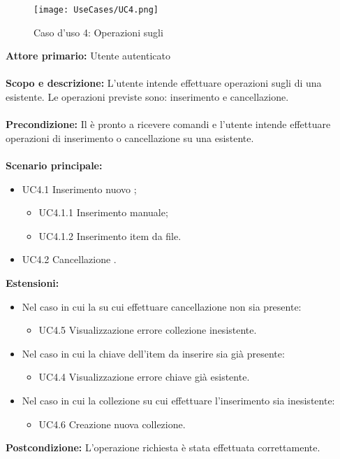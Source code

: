\documentclass{scalatekids-article}
\begin{document}
\begin{figure}[H]
  \begin{center}
    \texttt{[image: UseCases/UC4.png]}
    \caption*{Caso d'uso 4: Operazioni sugli }
  \end{center}
\end{figure}
\textbf{Attore primario:} Utente autenticato\\ \\
\textbf{Scopo e descrizione:} L'utente intende effettuare operazioni sugli  di una  esistente. Le operazioni previste sono:
inserimento e cancellazione.\\ \\
\textbf{Precondizione:} Il  è pronto a ricevere comandi e l'utente intende effettuare operazioni di inserimento o cancellazione su una  esistente.\\ \\
\textbf{Scenario principale:}
\begin{itemize}
\item UC4.1 Inserimento nuovo ;
  \begin{itemize}
  \item UC4.1.1 Inserimento  manuale;
  \item UC4.1.2 Inserimento  item da file.
  \end{itemize}
\item UC4.2 Cancellazione .
\end{itemize}
\textbf{Estensioni:}
\begin{itemize}
\item Nel caso in cui la  su cui effettuare cancellazione non sia presente:
  \begin{itemize}
  \item UC4.5 Visualizzazione errore collezione inesistente.
  \end{itemize}
\item Nel caso in cui la chiave dell'item da inserire sia già presente:
  \begin{itemize}
  \item UC4.4 Visualizzazione errore chiave già esistente.
  \end{itemize}
\item Nel caso in cui la collezione su cui effettuare l'inserimento sia inesistente:
  \begin{itemize}
  \item UC4.6 Creazione nuova collezione.
  \end{itemize}
\end{itemize}
\textbf{Postcondizione:} L'operazione richiesta è stata effettuata correttamente.
\end{document}
